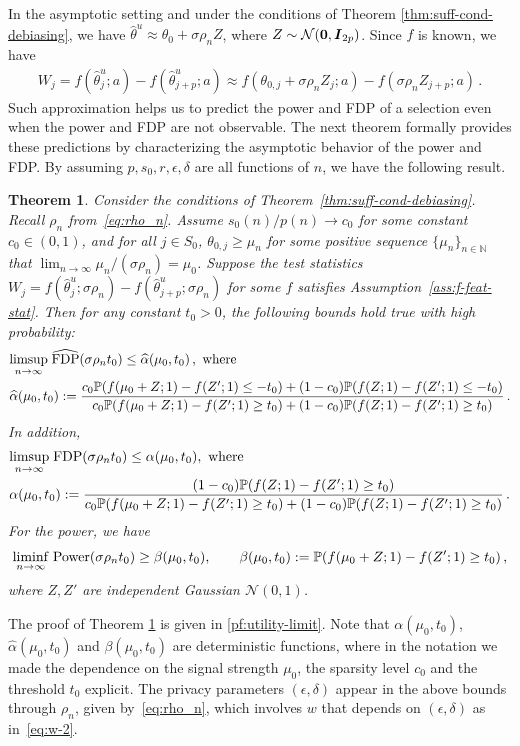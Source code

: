 \documentclass[11pt]{article}
\newtheorem{theorem}{Theorem}%
\newcommand{\bI}{\boldsymbol{I}}
\newcommand{\mcN}{\mathcal{N}}
\newcommand{\FDP}{{\rm FDP}}
\newcommand{\Power}{{\rm Power}}
\newcommand{\Prob}{\mathbb{P}}
\newcommand{\hth}{\widehat{\theta}}
\begin{document}
In the asymptotic setting and under the conditions of Theorem \ref{thm:suff-cond-debiasing}, we have $\hth^u \approx \theta_0+\sigma\rho_n Z$, where $Z\sim \mcN({{\bf{0}}},\bI_{2p})$. Since $f$ is known, we have
\begin{align*}
W_j = f(\hth^u_j;a)-f(\hth^u_{j+p};a)\approx f(\theta_{0,j}+\sigma\rho_nZ_j;a)- f(\sigma\rho_nZ_{j+p};a)\,.
\end{align*}
Such approximation helps us to predict the power and FDP of a selection even when the power and FDP are not observable. The next theorem formally provides these predictions by characterizing the asymptotic behavior of the power and FDP. By assuming $p,s_0,r,\epsilon,\delta$ are all functions of $n$, we have the following result.
\begin{theorem}\label{thm:utility-limit}
    Consider the conditions of Theorem~\ref{thm:suff-cond-debiasing}. Recall $\rho_n$ from~\eqref{eq:rho_n}. Assume $s_0(n)/p(n)\to c_0$ for some constant $c_0\in(0,1)$, and for all $j\in S_0$, $\theta_{0,j}\geq \mu_n$ for some positive sequence $\{\mu_n\}_{n\in\mathbb N}$ that $\lim_{n\to\infty}\mu_n/(\sigma\rho_n)=\mu_0$. Suppose the test statistics $W_j = f(\hth^u_j;\sigma\rho_n)-f(\hth^u_{j+p};\sigma\rho_n)$ for some $f$ satisfies Assumption~\ref{ass:f-feat-stat}. Then for any constant $t_0>0$, the following bounds hold true with high probability:
    \begin{align}\label{eq:FDP-hat-limit}
        &\underset{n\to\infty}{{\rm limsup}}\;\widehat{\FDP}(\sigma\rho_nt_0) \leq \widehat{\alpha}(\mu_0,t_0)\,, \text{ where } \\
        &\widehat{\alpha}(\mu_0,t_0):= \frac{c_0\Prob(f(\mu_0+Z;1)-f(Z';1)\leq -t_0)+(1-c_0)\Prob(f(Z;1)-f(Z';1)\leq -t_0)}{c_0\Prob(f(\mu_0+Z;1)-f(Z';1)\geq t_0)+(1-c_0)\Prob(f(Z;1)-f(Z';1)\geq t_0)}\nonumber\,.
    \end{align}
    In addition,
    \begin{align}\label{eq:FDP-limit}
        &\underset{n\to\infty}{{\rm limsup}}\;\FDP(\sigma\rho_nt_0) \leq \alpha(\mu_0,t_0), \text{ where }\\
        &\alpha(\mu_0,t_0):=  \frac{(1-c_0)\Prob(f(Z;1)-f(Z';1)\geq t_0)}{c_0\Prob(f(\mu_0+Z;1)-f(Z';1)\geq t_0)+(1-c_0)\Prob(f(Z;1)-f(Z';1)\geq t_0)}\nonumber\,.
    \end{align}
    For the power, we have 
    \begin{equation}\label{eq:power-limit}
        \underset{n\to\infty}{{\rm liminf}}\;\Power(\sigma\rho_nt_0) \geq \beta(\mu_0,t_0),\quad\quad 
        \beta(\mu_0,t_0):= \Prob(f(\mu_0+Z;1)-f(Z';1)\geq t_0)\,,
    \end{equation}
    where $Z,Z'$ are independent Gaussian $\mcN(0,1)$.
\end{theorem}
The proof of Theorem \ref{thm:utility-limit} is given in \ref{pf:utility-limit}. Note that $\alpha(\mu_0,t_0)$, $\widehat{\alpha}(\mu_0,t_0)$ and $\beta(\mu_0,t_0)$ are deterministic functions, where in the notation we made the dependence on the signal strength $\mu_0$, the sparsity level $c_0$ and the threshold $t_0$ explicit. The privacy parameters $(\epsilon, \delta)$ appear in the above bounds through $\rho_n$, given by~\eqref{eq:rho_n}, which involves $w$ that depends on $(\epsilon, \delta)$ as in~\eqref{eq:w-2}.
\end{document}
